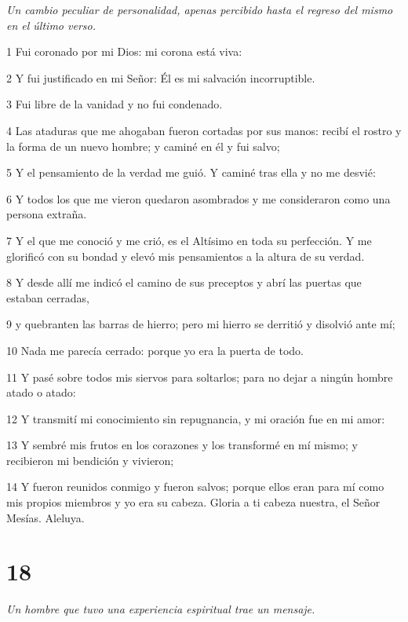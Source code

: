 \par \textit{Un cambio peculiar de personalidad, apenas percibido hasta el regreso del mismo en el último verso.}

\par 1 Fui coronado por mi Dios: mi corona está viva:
\par 2 Y fui justificado en mi Señor: Él es mi salvación incorruptible.
\par 3 Fui libre de la vanidad y no fui condenado.
\par 4 Las ataduras que me ahogaban fueron cortadas por sus manos: recibí el rostro y la forma de un nuevo hombre; y caminé en él y fui salvo;
\par 5 Y el pensamiento de la verdad me guió. Y caminé tras ella y no me desvié:
\par 6 Y todos los que me vieron quedaron asombrados y me consideraron como una persona extraña.
\par 7 Y el que me conoció y me crió, es el Altísimo en toda su perfección. Y me glorificó con su bondad y elevó mis pensamientos a la altura de su verdad.
\par 8 Y desde allí me indicó el camino de sus preceptos y abrí las puertas que estaban cerradas,
\par 9 y quebranten las barras de hierro; pero mi hierro se derritió y disolvió ante mí;
\par 10 Nada me parecía cerrado: porque yo era la puerta de todo.
\par 11 Y pasé sobre todos mis siervos para soltarlos; para no dejar a ningún hombre atado o atado:
\par 12 Y transmití mi conocimiento sin repugnancia, y mi oración fue en mi amor:
\par 13 Y sembré mis frutos en los corazones y los transformé en mí mismo; y recibieron mi bendición y vivieron;
\par 14 Y fueron reunidos conmigo y fueron salvos; porque ellos eran para mí como mis propios miembros y yo era su cabeza. Gloria a ti cabeza nuestra, el Señor Mesías. Aleluya.

\chapter{18}

\par \textit{Un hombre que tuvo una experiencia espiritual trae un mensaje.}

